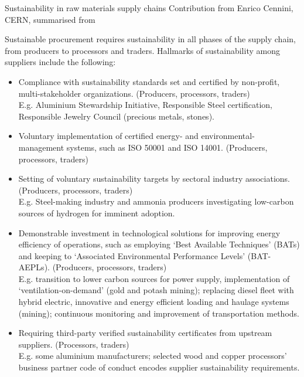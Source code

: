 \documentclass[../SustainableHEP.tex]{subfiles}
\begin{document}
\begin{bestpractice}{Sustainability in raw materials supply chains}
{\footnotesize Contribution from Enrico Cennini, CERN, summarised from ~\cite{EURaw}}

Sustainable procurement requires sustainability in all phases of the supply chain, from producers to processors and traders.  Hallmarks of sustainability among suppliers include the following:
\begin{itemize}
    \item Compliance with sustainability standards set and certified by non-profit, multi-stakeholder organizations. (Producers, processors, traders) \\\vspace{-0.1in} 
    {\small E.g. Aluminium Stewardship Initiative, Responsible Steel certification, Responsible Jewelry Council (precious metals, stones).}
    \item Voluntary implementation of certified energy- and environmental-management systems, such as ISO 50001 and ISO 14001. (Producers, processors, traders)  
    \item Setting of voluntary sustainability targets by sectoral industry associations. (Producers, processors, traders) \\
    {\small E.g. Steel-making industry and ammonia producers investigating low-carbon sources of hydrogen for imminent adoption.}
    \item Demonstrable investment in technological solutions for improving energy efficiency of operations, such as employing `Best Available Techniques' (BATs) and keeping to `Associated Environmental Performance Levels' (BAT-AEPLs). (Producers, processors, traders) \\ 
    {\small E.g. transition to lower carbon sources for power supply, implementation of `ventilation-on-demand' (gold and potash mining); replacing diesel fleet with hybrid electric, innovative and energy efficient loading and haulage systems (mining); continuous monitoring and improvement of transportation methods.}
    \item Requiring third-party verified sustainability certificates from upstream suppliers. (Processors, traders) \\
    {\small E.g. some aluminium manufacturers; selected wood and copper processors' business partner code of conduct encodes supplier sustainability requirements.}
\end{itemize}
\end{bestpractice}
\end{document}
